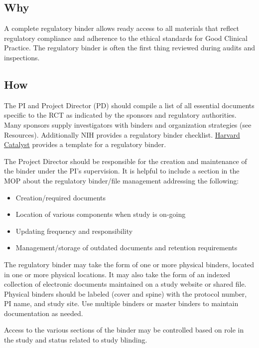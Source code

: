 \documentclass[]{book}
\providecommand{\tightlist}{%
  \setlength{\itemsep}{0pt}\setlength{\parskip}{0pt}}
\theoremstyle{definition}
\theoremstyle{definition}
\theoremstyle{definition}
\theoremstyle{remark}
\begin{document}
\subsection{Why}\label{why-16}

A complete regulatory binder allows ready access to all materials that
reflect regulatory compliance and adherence to the ethical standards for
Good Clinical Practice. The regulatory binder is often the first thing
reviewed during audits and inspections.

\subsection{How}\label{how-16}

The PI and Project Director (PD) should compile a list of all essential
documents specific to the RCT as indicated by the sponsors and
regulatory authorities. Many sponsors supply investigators with binders
and organization strategies (see Resources). Additionally NIH provides a
regulatory binder checklist.
\href{http://catalyst.harvard.edu/services/regbinder/}{Harvard Catalyst}
provides a template for a regulatory binder.

The Project Director should be responsible for the creation and
maintenance of the binder under the PI's supervision. It is helpful to
include a section in the MOP about the regulatory binder/file management
addressing the following:

\begin{itemize}
\tightlist
\item
  Creation/required documents
\item
  Location of various components when study is on-going
\item
  Updating frequency and responsibility
\item
  Management/storage of outdated documents and retention requirements
\end{itemize}

The regulatory binder may take the form of one or more physical binders,
located in one or more physical locations. It may also take the form of
an indexed collection of electronic documents maintained on a study
website or shared file. Physical binders should be labeled (cover and
spine) with the protocol number, PI name, and study site. Use multiple
binders or master binders to maintain documentation as needed.

Access to the various sections of the binder may be controlled based on
role in the study and status related to study blinding.
\end{document}
